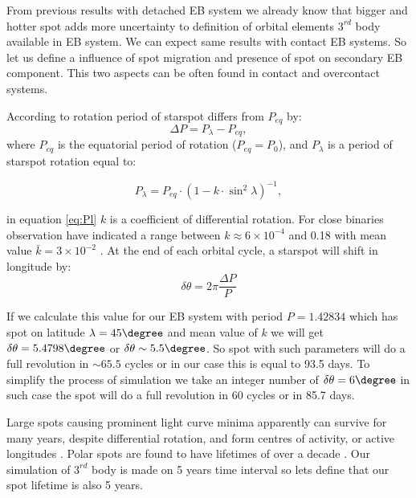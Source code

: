 From previous results with detached EB system we already know that bigger and hotter spot adds more uncertainty to definition of orbital elements $3^{rd}$ body available in EB system. We can expect same results with contact EB systems. So let us define a influence of spot migration and presence of spot on secondary EB component. This two aspects can be often found in contact and overcontact systems.
  
According to \cite{Kalimeris2002} rotation period of starspot differs from $P_{eq}$ by:
\begin{equation}
\Delta P = P_\lambda-P_{eq},  %
\end{equation} 
where $P_{eq}$ is the equatorial period of rotation ($P_{eq}=P_0$), and $P_{\lambda}$ is a period of starspot rotation equal to:

\begin{equation}
P_\lambda = P_{eq} \cdot (1-k \cdot \sin^{2}\lambda)^{-1}, 
\label{eq:Pl}
\end{equation} 

in equation \ref{eq:Pl} $k$ is a coefficient of differential rotation. For close binaries observation have indicated a range between 
$k\approx 6 \times10^{-4}$ and 0.18 with mean value $\bar{k}=3 \times10^{-2}$ \citep{Hall1990}. At the end of each orbital cycle, a starspot will shift  in longitude by: 
\begin{equation}
\delta \theta = 2\pi \frac{\Delta P}{P}
\end{equation}

If we calculate this value for our EB system with period $P=1.42834$ which has spot on latitude $\lambda=45\degree$ and mean value of $k$ we will get $\delta \theta = 5.4798\degree$ or $\delta \theta \sim 5.5\degree$. So spot with such parameters will do a full revolution in $\sim 65.5$ cycles or in our case this is equal to 93.5 days. To simplify the process of simulation we take an integer number of $\delta \theta = 6\degree$ in such case the spot will do a full revolution in 60 cycles or in 85.7 days. 

Large spots causing prominent light curve minima apparently can survive for many years, despite differential rotation, and form centres
of activity, or active longitudes \citep{Berdyugina2005}. Polar spots are found to have lifetimes of over a decade \citep{Hussain2002}.
Our simulation of $3^{rd}$ body is made on 5 years time interval so lets define that our spot lifetime is also 5 years.

